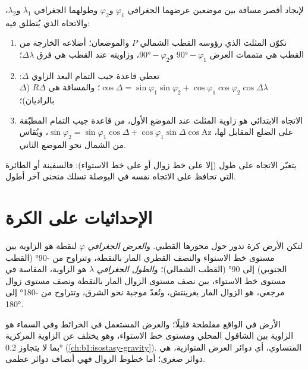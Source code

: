 \begin{method}\label{met:b1:spherical-astronomy:great-circle}
لإيجاد أقصر مسافة بين موضعين عرضهما الجغرافي $\varphi_1$ و$\varphi_2$ وطولهما الجغرافي $\lambda_1$ و$\lambda_2$، والاتجاه الذي يُنطلق فيه:
\begin{enumerate}
  \item نكوّن المثلث الذي رؤوسه القطب الشمالي $P$ والموضعان؛ أضلاعه الخارجة من القطب هي متممات العرض $\ang{90} -
        \varphi_1$ و$\ang{90} - \varphi_2$، وزاويته عند القطب هي فرق  $\Delta\lambda$؛
  \item تعطي قاعدة جيب التمام البعد الزاوي $\Delta$:
        $\cos\Delta = \sin\varphi_1\sin\varphi_2 +
        \cos\varphi_1\cos\varphi_2\cos\Delta\lambda$؛ والمسافة هي
        $R\Delta$ ($\Delta$ بالراديان)؛
  \item الاتجاه الابتدائي هو زاوية المثلث عند الموضع الأول، من قاعدة جيب التمام المطبّقة على الضلع المقابل لها،
        $\sin\varphi_2 = \sin\varphi_1\cos\Delta + \cos\varphi_1\sin\Delta\cos
        \mathrm{Az}$، ويُقاس من الشمال نحو الموضع الثاني.
\end{enumerate}
يتغيّر الاتجاه على طول  (إلا على خط زوال أو على خط الاستواء): فالسفينة أو الطائرة التي تحافظ على الاتجاه نفسه في البوصلة تسلك منحنى آخر أطول.
\end{method}

\section{الإحداثيات على الكرة}

\begin{definition}\label{def:b1:spherical-astronomy:geographic}
لتكن الأرض كرة تدور حول محورها القطبي. و\emph{العرض الجغرافي} $\varphi$ لنقطة هو الزاوية بين مستوى خط الاستواء والنصف القطري المار بالنقطة، وتتراوح من \ang{-90}
(القطب الجنوبي) إلى \ang{+90} (القطب الشمالي)؛ و\emph{الطول الجغرافي} $\lambda$ هو الزاوية، المقاسة في مستوى خط الاستواء، بين نصف مستوى الزوال المار بالنقطة ونصف مستوى زوال مرجعي، هو الزوال المار بغرينتش، وتُعدّ موجبة نحو الشرق، وتتراوح من \ang{-180} إلى \ang{180}.
\end{definition}

الأرض في الواقع مفلطحة قليلًا؛ والعرض المستعمل في الخرائط وفي السماء هو الزاوية بين الشاقول المحلي ومستوى خط الاستواء، وهو يختلف عن الزاوية المركزية بما لا يتجاوز \ang{0.2} (\cref{ch:b1:isostasy-gravity}).  المتساوي، أي دوائر العرض المتوازية، هي دوائر صغرى؛ أما خطوط الزوال فهي أنصاف دوائر عظمى.

